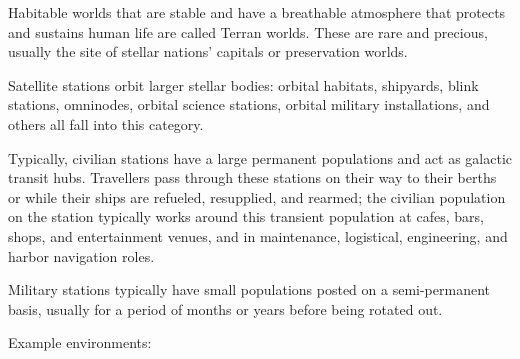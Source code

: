 Habitable worlds that are stable and have a breathable atmosphere that protects and sustains
human life are called Terran worlds. These are rare and precious, usually the site of stellar
nations’ capitals or preservation worlds.

Satellite stations orbit larger stellar bodies: orbital habitats, shipyards, blink stations, omninodes,
orbital science stations, orbital military installations, and others all fall into this category.

Typically, civilian stations have a large permanent populations and act as galactic transit hubs.
Travellers pass through these stations on their way to their berths or while their ships are
refueled, resupplied, and rearmed; the civilian population on the station typically works around
this transient population at cafes, bars, shops, and entertainment venues, and in maintenance,
logistical, engineering, and harbor navigation roles.

Military stations typically have small populations posted on a semi-permanent basis, usually for a
period of months or years before being rotated out.

Example environments:


